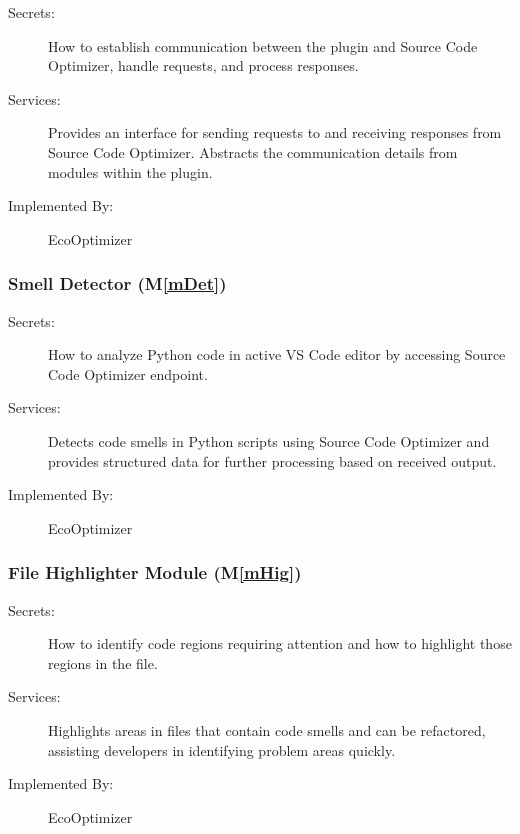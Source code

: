 \documentclass[12pt, titlepage]{article}
\newcommand{\mref}[1]{M\ref{#1}}
\begin{document}

\begin{description}
    \item[Secrets:] How to establish communication between the plugin and Source Code Optimizer, handle requests, and process responses.
    \item[Services:] Provides an interface for sending requests to and receiving responses from Source Code Optimizer. Abstracts the communication details from modules within the plugin.
    \item[Implemented By:] EcoOptimizer
\end{description}

\subsubsection{Smell Detector (\mref{mDet})}


\begin{description}
    \item[Secrets:] How to analyze Python code in active VS Code editor by accessing Source Code Optimizer endpoint.
    \item[Services:] Detects code smells in Python scripts using Source Code Optimizer and provides structured data for further processing based on received output.
    \item[Implemented By:] EcoOptimizer
\end{description}

\subsubsection{File Highlighter Module (\mref{mHig})}


\begin{description}
    \item[Secrets:] How to identify code regions requiring attention and how to highlight those regions in the file.
    \item[Services:] Highlights areas in files that contain code smells and can be refactored, assisting developers in identifying problem areas quickly.
    \item[Implemented By:] EcoOptimizer
\end{description}
\end{document}
